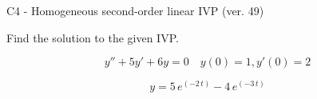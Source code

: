 \begin{exercise}
  \begin{exerciseTitle}C4 - Homogeneous second-order linear IVP (ver. 49)\end{exerciseTitle}
  \begin{exerciseStatement}
    
Find the solution to the given IVP.

    
\[y''+5y'+6y = 0 \hspace{1em} y(0) = 1 , y'(0) = 2\]

  \end{exerciseStatement}
  \begin{exerciseAnswer}
    
\[y= 5 \, e^{\left(-2 \, t\right)} - 4 \, e^{\left(-3 \, t\right)}\]

  \end{exerciseAnswer}
\end{exercise}